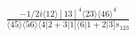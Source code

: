 \documentclass[varwidth, border=5pt]{standalone}
\begin{document}
\begin{my}
$\begin{gathered}
\scriptscriptstyle\frac{-1/2i⟨12⟩[13]^4⟨23⟩⟨46⟩^4}{⟨45⟩⟨56⟩⟨4|2+3|1]⟨6|1+2|3]s_{123}}
\end{gathered}$
\end{my}
\end{document}
